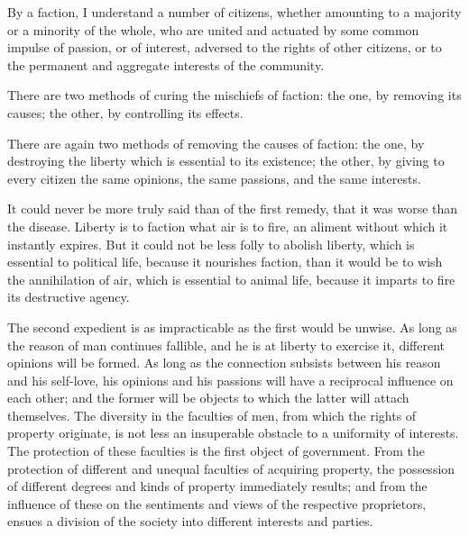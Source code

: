 By a faction, I understand a number of citizens, whether amounting to a majority or a minority of the whole, who are united and actuated by some common impulse of passion, or of interest, adversed to the rights of other citizens, or to the permanent and aggregate interests of the community.

There are two methods of curing the mischiefs of faction: the one, by removing its causes; the other, by controlling its effects.

There are again two methods of removing the causes of faction: the one, by destroying the liberty which is essential to its existence; the other, by giving to every citizen the same opinions, the same passions, and the same interests.

It could never be more truly said than of the first remedy, that it was worse than the disease. Liberty is to faction what air is to fire, an aliment without which it instantly expires. But it could not be less folly to abolish liberty, which is essential to political life, because it nourishes faction, than it would be to wish the annihilation of air, which is essential to animal life, because it imparts to fire its destructive agency.

The second expedient is as impracticable as the first would be unwise. As long as the reason of man continues fallible, and he is at liberty to exercise it, different opinions will be formed. As long as the connection subsists between his reason and his self-love, his opinions and his passions will have a reciprocal influence on each other; and the former will be objects to which the latter will attach themselves. The diversity in the faculties of men, from which the rights of property originate, is not less an insuperable obstacle to a uniformity of interests. The protection of these faculties is the first object of government. From the protection of different and unequal faculties of acquiring property, the possession of different degrees and kinds of property immediately results; and from the influence of these on the sentiments and views of the respective proprietors, ensues a division of the society into different interests and parties.

